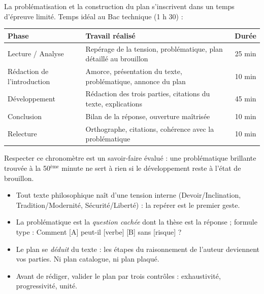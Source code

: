 \documentclass[11pt]{article}
\newcommand{\cle}[1]{{\popxbold\color{popdark}#1}}
\begin{document}
\begin{exemplebox}
La problématisation et la construction du plan s'inscrivent dans un temps d'épreuve limité. Temps idéal au Bac technique (1 h 30) :
\begin{center}
\begin{tabularx}{\linewidth}{|l|X|c|}
\hline
\rowcolor{popblueL} \textbf{Phase} & \textbf{Travail réalisé} & \textbf{Durée} \\
\hline
Lecture / Analyse & Repérage de la tension, problématique, plan détaillé au brouillon & 25 min \\
\hline
Rédaction de l'introduction & Amorce, présentation du texte, problématique, annonce du plan & 10 min \\
\hline
Développement & Rédaction des trois parties, citations du texte, explications & 45 min \\
\hline
Conclusion & Bilan de la réponse, ouverture maîtrisée & 10 min \\
\hline
Relecture & Orthographe, citations, cohérence avec la problématique & 10 min \\
\hline
\end{tabularx}
\end{center}
Respecter ce chronomètre est un savoir-faire évalué : une problématique brillante trouvée à la 50$^{\text{ème}}$ minute ne sert à rien si le développement reste à l'état de brouillon.
\end{exemplebox}

\begin{aretenir}
\begin{itemize}
\item Tout texte philosophique naît d'une \cle{tension interne} (Devoir/Inclination, Tradition/Modernité, Sécurité/Liberté) : la repérer est le premier geste.
\item La problématique est la \emph{question cachée} dont la thèse est la réponse ; formule type : \og Comment [A] peut-il [verbe] [B] sans [risque] ? \fg
\item Le plan se \emph{déduit} du texte : les étapes du raisonnement de l'auteur deviennent vos parties. Ni plan catalogue, ni plan plaqué.
\item Avant de rédiger, valider le plan par trois contrôles : \cle{exhaustivité}, \cle{progressivité}, \cle{unité}.
\end{itemize}
\end{aretenir}
\end{document}
